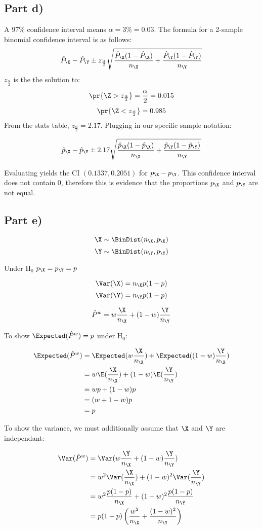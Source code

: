\subsection{Part d)}

A 97\% confidence interval means $\alpha = 3\% = 0.03$. The formula for a 2-sample binomial confidence interval is as follows:
\[
\hat{P}_\X - \hat{P}_\Y \pm z_{\frac{\alpha}{2}} \sqrt{\frac{\hat{P}_\X(1 - \hat{P}_\X)}{n_\X} + \frac{\hat{P}_\Y(1 - \hat{P}_\Y)}{n_\Y}}
\]
$z_{\frac{\alpha}{2}}$ is the the solution to:
\[
\pr{\Z > z_{\frac{\alpha}{2}}} = \frac{\alpha}{2} = 0.015
\]
\[
\pr{\Z < z_{\frac{\alpha}{2}}} = 0.985
\]
From the stats table, $z_{\frac{\alpha}{2}} = 2.17$. Plugging in our specific sample notation:

\[
\hat{p}_\X - \hat{p}_\Y \pm 2.17 \sqrt{\frac{\hat{p}_\X(1 - \hat{p}_\X)}{n_\X} + \frac{\hat{p}_\Y(1 - \hat{p}_\Y)}{n_\Y}}
\]

Evaluating yields the CI $(0.1337, 0.2051)$ for $p_\X - p_\Y$.
This confidence interval does not contain 0, therefore this is evidence that the proportions $p_\X$ and $p_\Y$ are not equal.

\subsection{Part e)}
\[
\X \sim \BinDist (n_\X, p_\X)
\]
\[
\Y \sim \BinDist (n_\Y, p_\Y)
\]

Under $\text{H}_0$ $p_\X = p_\Y = p$

\[
\Var(\X) = n_\X p (1 - p)
\]
\[
\Var(\Y) = n_\Y p (1 - p)
\]

\[
\hat{P}^w = w \frac{\X}{n_\X} + (1 - w)\frac{\Y}{n_\Y}
\]

To show $\Expected(\hat{P}^w) = p$ under $\text{H}_0$:

\begin{align*}
\Expected(\hat{P}^w) &= \Expected(w\frac{\X}{n_\X}) + \Expected((1-w)\frac{\Y}{n_\X}) \\
&= w \E(\frac{\X}{n_\X}) + (1-w)\E(\frac{\Y}{n_\Y}) \\
&= wp + (1-w)p \\
&= (w + 1 - w)p \\
&= p
\end{align*}

To show the variance, we must additionally assume that $\X$ and $\Y$ are independant:

\begin{align*}
\Var(\hat{P}^w) &= \Var(w \frac{\Y}{n_\X} + (1-w)\frac{\Y}{n_\Y}) \\
&= w^2 \Var(\frac{\X}{n_\X}) + (1-w)^2 \Var(\frac{\Y}{n_\Y}) \\
&= w^2 \frac{p(1-p)}{n_\X} + (1-w)^2 \frac{p(1-p)}{n_\Y} \\
&= p(1-p)\left( \frac{w^2}{n_\X} + \frac{(1-w)^2}{n_\Y} \right)
\end{align*}
